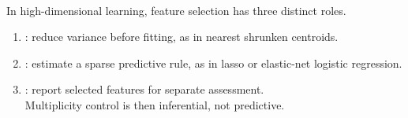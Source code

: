 \begin{remark} \label{rem:sl-high-dimensional-feature-selection-roles} \\
In high-dimensional learning, feature selection has three distinct roles.
\begin{enumerate}[label=(\roman*)]
\setlength{\itemsep}{0pt}
\item {}: reduce variance before fitting, as in nearest shrunken centroids.
\item {}: estimate a sparse predictive rule, as in lasso or elastic-net logistic regression.
\item {}: report selected features for separate assessment.\\
Multiplicity control is then inferential, not predictive.
\end{enumerate}
\end{remark}
